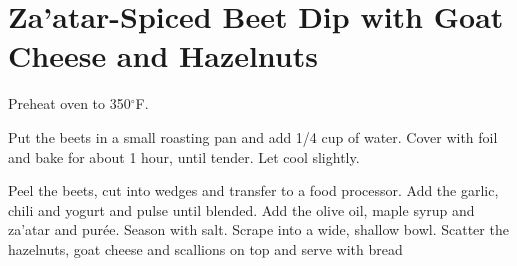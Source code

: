 \section[Za'atar-Spiced Beet Dip]{Za'atar-Spiced Beet Dip with Goat Cheese and Hazelnuts}
\begin{recipe}






	Preheat oven to 350$^{\circ}$F.

	Put the beets in a small roasting pan and add 1/4 cup of water. Cover with foil and bake for about 1 hour, until tender. Let cool slightly.

	Peel the beets, cut into wedges and transfer to a food processor. Add the garlic, chili and yogurt and pulse until blended. Add the olive oil, maple syrup and za'atar and pur\'ee. Season with salt. Scrape into a wide, shallow bowl. Scatter the hazelnuts, goat cheese and scallions on top and serve with bread


\end{recipe}
